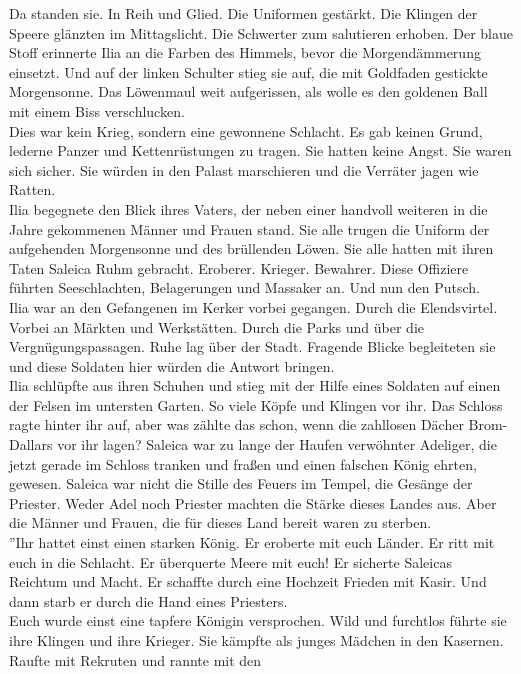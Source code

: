 Da standen sie. In Reih und Glied. Die Uniformen gestärkt. Die Klingen der Speere glänzten im 
Mittagslicht. Die Schwerter zum salutieren erhoben. Der blaue Stoff erinnerte Ilia an die 
Farben des Himmels, bevor die Morgendämmerung einsetzt. Und auf der linken Schulter stieg sie 
auf, die mit Goldfaden gestickte Morgensonne. Das Löwenmaul weit aufgerissen, als wolle es den 
goldenen Ball mit einem Biss verschlucken.\\
Dies war kein Krieg, sondern eine gewonnene Schlacht. Es gab keinen Grund, lederne Panzer und 
Kettenrüstungen zu tragen. Sie hatten keine Angst. Sie waren sich sicher. Sie würden in den Palast 
marschieren und die Verräter jagen wie Ratten.\\
Ilia begegnete den Blick ihres Vaters, der neben einer handvoll weiteren in die Jahre gekommenen 
Männer und Frauen stand. Sie alle trugen die Uniform der aufgehenden Morgensonne und des 
brüllenden Löwen. Sie alle hatten mit ihren Taten Saleica Ruhm gebracht. Eroberer. Krieger. 
Bewahrer. Diese Offiziere führten Seeschlachten, Belagerungen und Massaker an. Und nun den Putsch.\\
Ilia war an den Gefangenen im Kerker vorbei gegangen. Durch die Elendsvirtel. Vorbei an Märkten und 
Werkstätten. Durch die Parks und über die Vergnügungspassagen. Ruhe lag über der Stadt. Fragende 
Blicke begleiteten sie und diese Soldaten hier würden die Antwort bringen.\\
Ilia schlüpfte aus ihren Schuhen und stieg mit der Hilfe eines Soldaten auf einen der 
Felsen im untersten Garten. So viele Köpfe und Klingen vor ihr. Das Schloss ragte hinter ihr auf, 
aber was zählte das schon, wenn die zahllosen Dächer Brom-Dallars vor ihr lagen? Saleica war zu 
lange der Haufen verwöhnter Adeliger, die jetzt gerade im Schloss tranken und fraßen und einen 
falschen König ehrten, gewesen. Saleica war nicht die Stille des Feuers im Tempel, die Gesänge 
der Priester. Weder Adel noch Priester machten die Stärke dieses Landes aus. Aber die Männer und 
Frauen, die für dieses Land bereit waren zu sterben.\\
''Ihr hattet einst einen starken König. Er eroberte mit euch Länder. Er ritt mit euch in die 
Schlacht. Er überquerte Meere mit euch! Er sicherte Saleicas Reichtum und Macht. Er schaffte durch 
eine Hochzeit Frieden mit Kasir. Und dann starb er durch die Hand eines Priesters.\\
Euch wurde einst eine tapfere Königin versprochen. Wild und furchtlos führte sie ihre Klingen und 
ihre Krieger. Sie kämpfte als junges Mädchen in den Kasernen. Raufte mit Rekruten und rannte mit den 
